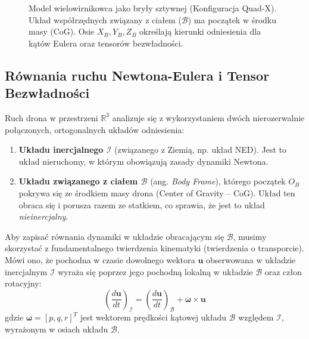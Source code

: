 \begin{figure}[ht]
    \vspace{0.5cm}
    \caption{Model wielowirnikowca jako bryły sztywnej (Konfiguracja Quad-X). Układ współrzędnych związany z ciałem ($\mathcal{B}$) ma początek w środku masy (CoG). Osie $X_B, Y_B, Z_B$ określają kierunki odniesienia dla kątów Eulera oraz tensorów bezwładności.}
    \label{fig:rigid_body}
\end{figure}

\subsection{Równania ruchu Newtona-Eulera i Tensor Bezwładności}

Ruch drona w przestrzeni $\mathbb{R}^3$ analizuje się z wykorzystaniem dwóch nierozerwalnie połączonych, ortogonalnych układów odniesienia:
\begin{enumerate}
    \item \textbf{Układu inercjalnego $\mathcal{I}$} (związanego z Ziemią, np. układ NED). Jest to układ nieruchomy, w którym obowiązują zasady dynamiki Newtona.
    \item \textbf{Układu związanego z ciałem $\mathcal{B}$} (ang. \textit{Body Frame}), którego początek $O_B$ pokrywa się ze środkiem masy drona (Center of Gravity -- CoG). Układ ten obraca się i porusza razem ze statkiem, co sprawia, że jest to układ \textit{nieinercjalny}.
\end{enumerate}

Aby zapisać równania dynamiki w układzie obracającym się $\mathcal{B}$, musimy skorzystać z fundamentalnego twierdzenia kinematyki (twierdzenia o transporcie). Mówi ono, że pochodna w czasie dowolnego wektora $\mathbf{u}$ obserwowana w układzie inercjalnym $\mathcal{I}$ wyraża się poprzez jego pochodną lokalną w układzie $\mathcal{B}$ oraz człon rotacyjny:
\begin{equation}
    \left( \frac{d\mathbf{u}}{dt} \right)_{\mathcal{I}} = \left( \frac{d\mathbf{u}}{dt} \right)_{\mathcal{B}} + \boldsymbol{\omega} \times \mathbf{u}
    \label{eq:transport_theorem}
\end{equation}
gdzie $\boldsymbol{\omega} = [p, q, r]^T$ jest wektorem prędkości kątowej układu $\mathcal{B}$ względem $\mathcal{I}$, wyrażonym w osiach układu $\mathcal{B}$.

